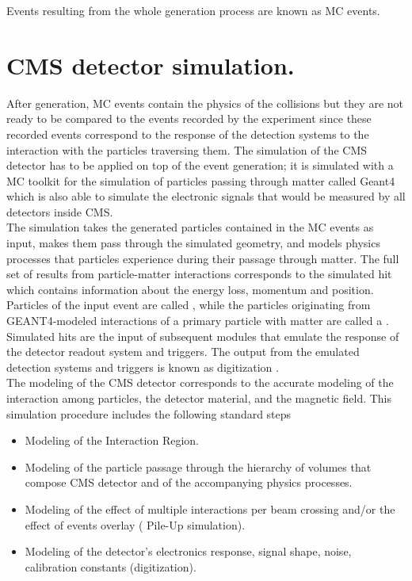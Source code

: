\noindent Events resulting from the whole generation process are known as MC events. 

\section{CMS detector simulation.}

\noindent After generation, MC events contain the physics of the collisions but they are not ready to be compared to the events recorded by the experiment since these recorded events correspond to the response of the detection systems to the interaction with the particles traversing them. The simulation of the CMS detector has to be applied on top of the event generation; it is simulated with a MC toolkit for the simulation of particles passing through matter called Geant4 which is also able to simulate the electronic signals that would be measured by all detectors inside CMS.\\   

\noindent The simulation takes the generated particles contained in the MC events as input, makes them pass through the simulated geometry, and models physics processes that particles experience during their passage through matter. The full set of results from particle-matter interactions corresponds to the simulated hit which contains information about the energy loss, momentum and position. Particles of the input event are called , while the particles originating from GEANT4-modeled interactions of a primary particle with matter are called a .  Simulated hits are the input of subsequent modules that emulate the response of the detector readout system and triggers. The output from the emulated detection systems and triggers is known as digitization \cite{geant,geant2}.\\

\noindent The modeling of the CMS detector corresponds to the accurate modeling of the interaction among particles, the detector material, and the magnetic field. This simulation procedure includes the following standard steps
\begin{itemize}
\item Modeling of the Interaction Region.
\item Modeling of the particle passage through the hierarchy of volumes that compose CMS detector and of the accompanying physics processes.
\item Modeling of the effect of multiple interactions per beam crossing and/or the effect of events overlay ( Pile-Up simulation).
\item Modeling of the detector's electronics response, signal shape, noise, calibration constants (digitization). 
\end{itemize}

